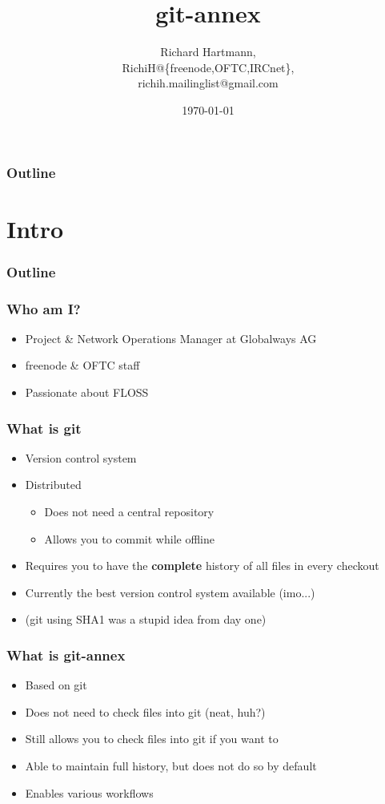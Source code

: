\documentclass[t]{beamer}
\title{git-annex}
\author{Richard Hartmann,\\
RichiH@\{freenode,OFTC,IRCnet\},\\
richih.mailinglist@gmail.com}
\date{\today}
\begin{document}
\begin{frame}
	\titlepage
\end{frame}

\begin{frame}
	\frametitle{Outline}
	\tableofcontents
\end{frame}


\section{Intro}

\begin{frame}
	\frametitle{Outline}
	\tableofcontents[currentsection]
\end{frame}

\begin{frame}
	\frametitle{Who am I?}
	\begin{itemize}
		\item Project \& Network Operations Manager at Globalways AG
		\item freenode \& OFTC staff
		\item Passionate about FLOSS
	\end{itemize}
\end{frame}

\begin{frame}
	\frametitle{What is git}
	\begin{itemize}
		\item Version control system
		\item Distributed
		\begin{itemize}
			\item Does not need a central repository
			\item Allows you to commit while offline
		\end{itemize}
		\item Requires you to have the \textbf{complete} history of all files in every checkout
		\item Currently the best version control system available (imo...)
		\item (git using SHA1 was a stupid idea from day one)
	\end{itemize}
\end{frame}

\begin{frame}
	\frametitle{What is git-annex}
	\begin{itemize}
		\item Based on git
		\item Does not need to check files into git (neat, huh?)
		\item Still allows you to check files into git if you want to
		\item Able to maintain full history, but does not do so by default
		\item Enables various workflows
	\end{itemize}
\end{frame}
\end{document}

